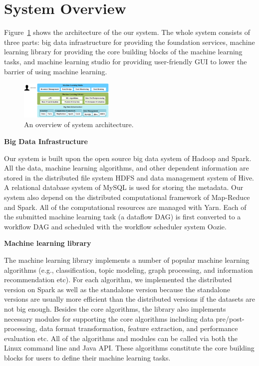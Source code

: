 \documentclass{sig-alternate-05-2015}
\begin{document}
\section{System Overview}
Figure~\ref{fig:arch} shows the architecture of the our system. The whole system consists of three parts: big data infrastructure for providing the foundation services, machine learning library for providing the core building blocks of the machine learning tasks, and machine learning studio for providing user-friendly GUI to lower the barrier of using machine learning.

\begin{figure}[t]
\centering
\includegraphics[width=0.4\textwidth]{arch.eps}
\caption{ An overview of system architecture.}
\label{fig:arch}
\end{figure}

\noindent\textbf{Big Data Infrastructure}

Our system is built upon the open source big data system of Hadoop and Spark. All the data, machine learning algorithms, and other dependent information are stored in the distributed file system HDFS and data management system of Hive. A relational database system of MySQL is used for storing the metadata. Our system also depend on the distributed computational framework of Map-Reduce and Spark. All of the computational resources are managed with Yarn. Each of the submitted machine learning task (a dataflow DAG) is first converted to a workflow DAG and scheduled with the workflow scheduler system Oozie.

\noindent\textbf{Machine learning library}

The machine learning library implements a number of popular machine learning algorithms (e.g., classification, topic modeling, graph processing, and information recommendation etc). For each algorithm, we implemented the distributed version on Spark as well as the standalone version because the standalone versions are usually more efficient than the distributed versions if the datasets are not big enough. Besides the core algorithms, the library also implements necessary modules for supporting the core algorithms including data pre/post-processing, data format transformation, feature extraction, and performance evaluation etc. All of the algorithms and modules can be called via both the Linux command line and Java API. These algorithms constitute the core building blocks for users to define their machine learning tasks.
\end{document}
